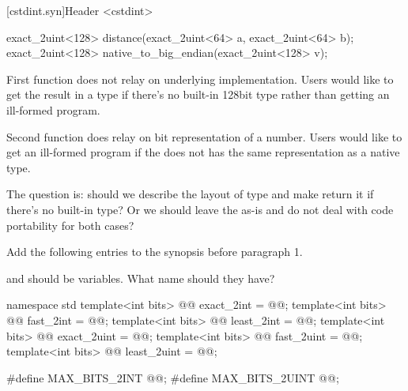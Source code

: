 [cstdint.syn]{Header <cstdint>}

\begin{modifcommentblock}
\begin{example}
\begin{codeblock}
exact_2uint<128> distance(exact_2uint<64> a, exact_2uint<64> b);
exact_2uint<128> native_to_big_endian(exact_2uint<128> v);
\end{codeblock}
First function does not relay on underlying implementation. Users would like to get the result in a  type if there's no built-in 128bit type rather than getting an ill-formed program.

Second function does relay on bit representation of a number. Users would like to get an ill-formed program if the  does not has the same representation as a native type.

The question is: should we describe the layout of  type and make  return it if there's no built-in type?
Or we should leave the  as-is and do not deal with code portability for both cases?
\end{example}
\end{modifcommentblock}

Add the following entries to the synopsis before paragraph 1.

\begin{modifcommentblock}
 and  should be  variables. What name should they have?
\end{modifcommentblock}

\begin{addedblock}
\begin{codeblock}
namespace std {
  template<int bits> @@ exact_2int = @\impdefx{}@;
  template<int bits> @@ fast_2int = @\impdefx{}@;
  template<int bits> @@ least_2int = @\impdefx{}@;
  template<int bits> @@ exact_2uint = @\impdefx{}@;
  template<int bits> @@ fast_2uint = @\impdefx{}@;
  template<int bits> @@ least_2uint = @\impdefx{}@;
}

#define MAX_BITS_2INT @\impdefx{}@;
#define MAX_BITS_2UINT @\impdefx{}@;
\end{codeblock}
\end{addedblock}


